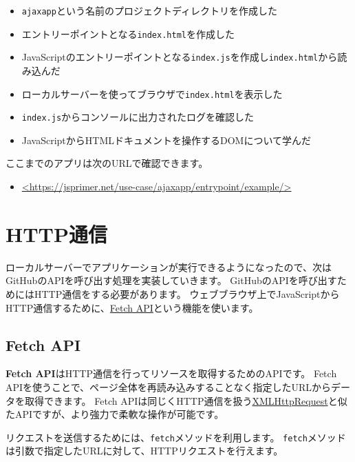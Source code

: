 \begin{itemize}
\item
  \texttt{ajaxapp}という名前のプロジェクトディレクトリを作成した
\item
  エントリーポイントとなる\texttt{index.html}を作成した
\item
  JavaScriptのエントリーポイントとなる\texttt{index.js}を作成し\texttt{index.html}から読み込んだ
\item
  ローカルサーバーを使ってブラウザで\texttt{index.html}を表示した
\item
  \texttt{index.js}からコンソールに出力されたログを確認した
\item
  JavaScriptからHTMLドキュメントを操作するDOMについて学んだ
\end{itemize}

ここまでのアプリは次のURLで確認できます。

\begin{itemize}
\item
  \url{<https://jsprimer.net/use-case/ajaxapp/entrypoint/example/>}
\end{itemize}

\hypertarget{http-communication}{%
\section{HTTP通信}\label{http-communication}}

ローカルサーバーでアプリケーションが実行できるようになったので、次はGitHubのAPIを呼び出す処理を実装していきます。
GitHubのAPIを呼び出すためにはHTTP通信をする必要があります。
ウェブブラウザ上でJavaScriptからHTTP通信するために、\href{https://developer.mozilla.org/ja/docs/Web/API/Fetch_API}{Fetch
API}という機能を使います。

\hypertarget{fetch-api}{%
\subsection{Fetch API}\label{fetch-api}}

\textbf{Fetch API}はHTTP通信を行ってリソースを取得するためのAPIです。
Fetch
APIを使うことで、ページ全体を再読み込みすることなく指定したURLからデータを取得できます。
Fetch
APIは同じくHTTP通信を扱う\href{https://developer.mozilla.org/ja/docs/Web/API/XMLHttpRequest}{XMLHttpRequest}と似たAPIですが、より強力で柔軟な操作が可能です。

リクエストを送信するためには、\texttt{fetch}メソッドを利用します。
\texttt{fetch}メソッドは引数で指定したURLに対して、HTTPリクエストを行えます。

